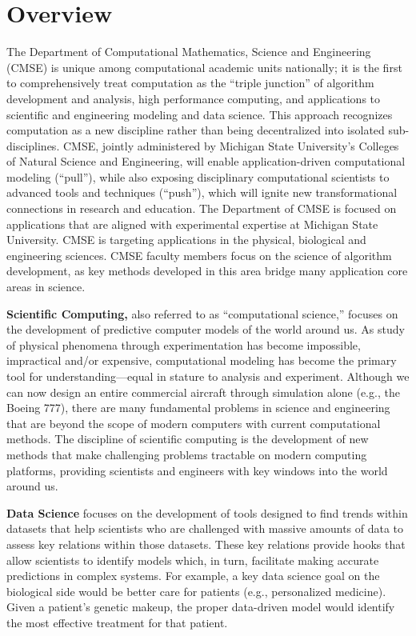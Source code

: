 \section{Overview}
\label{sec:overview}


The Department of Computational Mathematics, Science and Engineering
(CMSE) is unique among computational academic units nationally; it is
the first to comprehensively treat computation as the ``triple
junction'' of algorithm development and analysis, high performance
computing, and applications to scientific and engineering modeling and
data science. This approach recognizes computation as a new discipline
rather than being decentralized into isolated sub-disciplines. CMSE,
jointly administered by Michigan State University's Colleges of
Natural Science and Engineering, will enable application-driven
computational modeling (``pull''), while also exposing disciplinary
computational scientists to advanced tools and techniques (“push”),
which will ignite new transformational connections in research and
education.  The Department of CMSE is focused on applications that are
aligned with experimental expertise at Michigan State University. CMSE
is targeting applications in the physical, biological and engineering
sciences. CMSE faculty members focus on the science of algorithm
development, as key methods developed in this area bridge many
application core areas in science.

\vspace{2mm}
\noindent
\textbf{Scientific Computing,} also referred to as ``computational science,''
focuses on the development of predictive computer models of the world
around us. As study of physical phenomena through experimentation has
become impossible, impractical and/or expensive, computational
modeling has become the primary tool for understanding—equal in
stature to analysis and experiment. Although we can now design an
entire commercial aircraft through simulation alone (e.g., the Boeing
777), there are many fundamental problems in science and engineering
that are beyond the scope of modern computers with current
computational methods. The discipline of scientific computing is the
development of new methods that make challenging problems tractable on
modern computing platforms, providing scientists and engineers with
key windows into the world around us.

\vspace{2mm}
\noindent
\textbf{Data Science} focuses on the development of
tools designed to find trends within datasets that help scientists who
are challenged with massive amounts of data to assess key relations
within those datasets. These key relations provide hooks that allow
scientists to identify models which, in turn, facilitate making
accurate predictions in complex systems. For example, a key data
science goal on the biological side would be better care for patients
(e.g., personalized medicine). Given a patient’s genetic makeup, the
proper data-driven model would identify the most effective treatment
for that patient.

